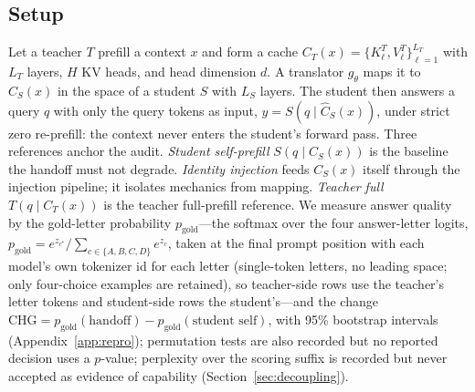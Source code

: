 \documentclass[10pt]{article}
\newcommand{\chg}{\mathrm{CHG}}
\newcommand{\gold}{p_{\mathrm{gold}}}
\begin{document}
\subsection{Setup}
Let a teacher $T$ prefill a context $x$ and form a cache
$C_T(x) = \{K^T_\ell, V^T_\ell\}_{\ell=1}^{L_T}$ with $L_T$ layers, $H$ KV
heads, and head dimension $d$. A translator $g_\theta$ maps it to
$\widehat{C}_S(x)$ in the space of a student $S$ with $L_S$ layers. The
student then answers a query $q$ with only the query tokens as input,
$\hat{y} = S(q \mid \widehat{C}_S(x))$, under strict zero re-prefill: the
context never enters the student's forward pass. Three references anchor the
audit. \emph{Student self-prefill} $S(q \mid C_S(x))$ is the baseline the
handoff must not degrade. \emph{Identity injection} feeds $C_S(x)$ itself
through the injection pipeline; it isolates mechanics from mapping.
\emph{Teacher full} $T(q \mid C_T(x))$ is the teacher full-prefill reference. We
measure answer quality by the gold-letter probability $\gold$---the softmax over
the four answer-letter logits,
$\gold = e^{z_{c^\star}}/\sum_{c \in \{A,B,C,D\}} e^{z_c}$, taken at the final
prompt position with each model's own tokenizer id for each letter (single-token
letters, no leading space; only four-choice examples are retained), so teacher-side rows use the teacher's letter tokens
and student-side rows the student's---and the change
$\chg = \gold(\text{handoff}) - \gold(\text{student self})$, with
95\% bootstrap intervals (Appendix~\ref{app:repro}); permutation tests are also
recorded but no reported decision uses a $p$-value; perplexity over the
scoring suffix is recorded but never accepted as evidence of capability
(Section~\ref{sec:decoupling}).
\end{document}
